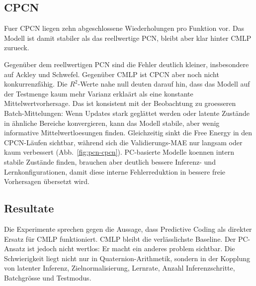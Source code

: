 \subsection{CPCN}

Fuer CPCN liegen zehn abgeschlossene Wiederholungen pro Funktion vor. Das Modell ist damit stabiler als das reellwertige PCN, bleibt aber klar hinter CMLP zurueck.

\begin{table}[H]
\centering
\footnotesize
\caption{CPCN-Testresultate. Werte sind Mittelwerte $\pm$ Standardabweichung ueber zehn Wiederholungen.}
\label{tab:cpcn-results}
\end{table}

Gegenüber dem reellwertigen PCN sind die Fehler deutlich kleiner, insbesondere auf Ackley und Schwefel. Gegenüber CMLP ist CPCN aber noch nicht konkurrenzfähig. Die $R^2$-Werte nahe null deuten darauf hin, dass das Modell auf der Testmenge kaum mehr Varianz erklaärt als eine konstante Mittelwertvorhersage. Das ist konsistent mit der Beobachtung zu groesseren Batch-Mittelungen: Wenn Updates stark geglättet werden oder latente Zustände in ähnliche Bereiche konvergieren, kann das Modell stabile, aber wenig informative Mittelwertloesungen finden. Gleichzeitig sinkt die Free Energy in den CPCN-Läufen sichtbar, während sich die Validierungs-MAE nur langsam oder kaum verbessert (Abb.~\ref{fig:pcn-cpcn}). PC-basierte Modelle koennen intern stabile Zustände finden, brauchen aber deutlich bessere Inferenz- und Lernkonfigurationen, damit diese interne Fehlerreduktion in bessere freie Vorhersagen übersetzt wird.

\subsection{Resultate}

Die Experimente sprechen gegen die Aussage, dass Predictive Coding als direkter Ersatz für CMLP funktioniert. CMLP bleibt die verlässlichste Baseline. Der PC-Ansatz ist jedoch nicht wertlos: Er macht ein anderes problem sichtbar. Die Schwierigkeit liegt nicht nur in Quaternion-Arithmetik, sondern in der Kopplung von latenter Inferenz, Zielnormalisierung, Lernrate, Anzahl Inferenzschritte, Batchgrösse und Testmodus.

